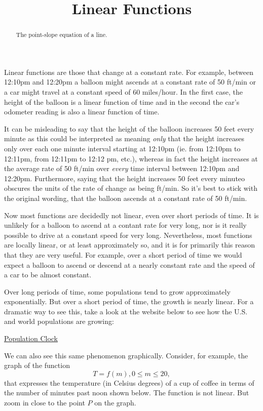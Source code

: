 \documentclass{ximera}
\title{Linear Functions}
\begin{document}
\begin{abstract}
The point-slope equation of a line.
\end{abstract}
\maketitle

Linear functions are those that change at a constant rate. For example, between 12:10pm and 12:20pm a balloon might ascends at a constant rate of 50 ft/min or a car might travel at a constant speed of 60 miles/hour. In the first case, the height of the balloon is a linear function of time and in the second the car's odometer reading is also a linear function of time.

It can be misleading to say that the height of the balloon increases 50 feet every minute as this could be interpreted as meaning \emph{only} that the height increases only over each one minute interval starting at 12:10pm (ie. from 12:10pm to 12:11pm, from 12:11pm to 12:12 pm, etc.), whereas in fact the height increases at the average rate of 50 ft/min over \emph{every} time interval between 12:10pm and 12:20pm. Furthermore, saying that the height increases 50 feet every minuteo obscures the units of the rate of change as being ft/min. So it's best to stick with the original wording, that the balloon ascends at a constant rate of 50 ft/min.

Now most functions are decidedly not linear, even over short periods of time. It is unlikely for a balloon to ascend at a contant rate for very long, nor is it really possible to drive at a constant speed for very long. Nevertheless, most functions are locally linear, or at least approximately so, and it is for primarily this reason that they are very useful. For example, over a short period of time we would expect a balloon to ascend or descend at a nearly constant rate and the speed of a car to be almost constant. 

Over long periods of time, some populations tend to grow approximately exponentially. But over a short period of time, the growth is nearly linear. For a dramatic way to see this, take a look at the website below to see how the U.S. and world populations are growing:

\href{https://www.census.gov/popclock/}{Population Clock}

We can also see this same phenomenon graphically. Consider, for example, the graph of the function
\[
    T = f(m) , 0\leq m \leq 20 ,
\]
that expresses the temperature (in Celsius degrees) of a cup of coffee in terms of the number of minutes past noon shown below. The function is not linear. But zoom in close to the point $P$ on the graph.
\end{document}
